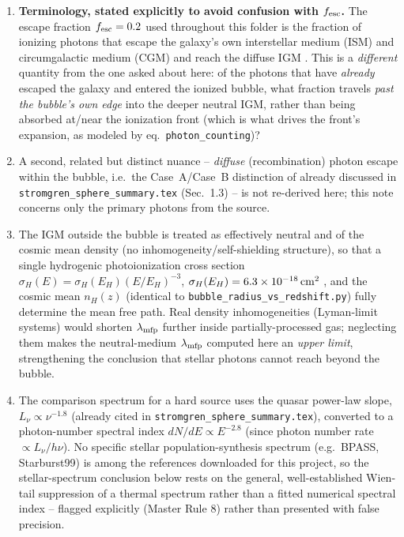 \documentclass[11pt,a4paper]{article}
\newcommand{\lmfp}{\lambda_{\rm mfp}}
\begin{document}
\begin{enumerate}
\item \textbf{Terminology, stated explicitly to avoid confusion with $f_{\rm esc}$.} The escape fraction
      $f_{\rm esc}=0.2$ \citep{Robertson2015} used throughout this folder is the fraction of ionizing
      photons that escape the galaxy's own interstellar medium (ISM) and circumgalactic medium (CGM) and
      reach the diffuse IGM \citep[explicit definition in][their Sec.~2.5]{Gnedin2022}. This is a
      \emph{different} quantity from the one asked about here: of the photons that have \emph{already}
      escaped the galaxy and entered the ionized bubble, what fraction travels \emph{past the bubble's own
      edge} into the deeper neutral IGM, rather than being absorbed at/near the ionization front (which is
      what drives the front's expansion, as modeled by eq.~\texttt{photon\_counting})?
\item A second, related but distinct nuance -- \emph{diffuse} (recombination) photon escape within the
      bubble, i.e.\ the Case~A/Case~B distinction of \citet{Nebrin2023} already discussed in
      \texttt{stromgren\_sphere\_summary.tex} (Sec.~1.3) -- is not re-derived here; this note concerns only
      the primary photons from the source.
\item The IGM outside the bubble is treated as effectively neutral and of the cosmic mean density (no
      inhomogeneity/self-shielding structure), so that a single hydrogenic photoionization cross section
      $\sigma_H(E)=\sigma_H(E_H)(E/E_H)^{-3}$, $\sigma_H(E_H)=6.3\times10^{-18}\,{\rm cm^2}$
      \citep[eq.~46]{Choudhury2022}, and the cosmic mean $n_H(z)$ (identical to
      \texttt{bubble\_radius\_vs\_redshift.py}) fully determine the mean free path. Real density
      inhomogeneities (Lyman-limit systems) would shorten $\lmfp$ further inside partially-processed gas;
      neglecting them makes the neutral-medium $\lmfp$ computed here an \emph{upper limit}, strengthening
      the conclusion that stellar photons cannot reach beyond the bubble.
\item The comparison spectrum for a hard source uses the \citet{Cen2000} quasar power-law slope,
      $L_\nu\propto\nu^{-1.8}$ (already cited in \texttt{stromgren\_sphere\_summary.tex}), converted to a
      photon-number spectral index $dN/dE\propto E^{-2.8}$ (since photon number rate $\propto L_\nu/h\nu$).
      No specific stellar population-synthesis spectrum (e.g.\ BPASS, Starburst99) is among the references
      downloaded for this project, so the stellar-spectrum conclusion below rests on the general,
      well-established Wien-tail suppression of a thermal spectrum rather than a fitted numerical spectral
      index -- flagged explicitly (Master Rule 8) rather than presented with false precision.
\end{enumerate}
\end{document}
